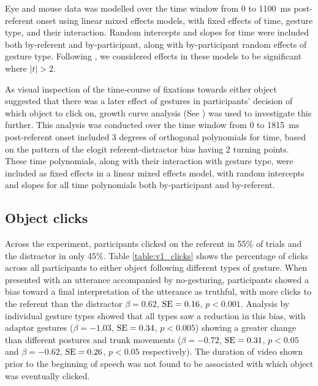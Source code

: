 \documentclass[a4paper,man,natbib]{apa6}
\newcommand{\resultsLog}[3]{$\beta = #1$, $\textnormal{SE} = #2$, $p #3$}
\begin{document}
Eye and mouse data was modelled over the time window from 0 to 1100~ms post-referent onset using linear mixed effects models, with fixed effects of time, gesture type, and their interaction.
Random intercepts and slopes for time were included both by-referent and by-participant, along with by-participant random effects of gesture type.
Following \citet{Baayen2008}, we considered effects in these models to be significant where $|t|>2$.

As visual inspection of the time-course of fixations towards either object suggested that there was a later effect of gestures in participants' decision of which object to click on, growth curve analysis (See \citealt{Mirman2008}) was used to investigate this further. 
This analysis was conducted over the time window from 0 to 1815~ms post-referent onset included 3 degrees of orthogonal polynomials for time, based on the pattern of the elogit referent-distractor bias having 2 turning points. 
These time polynomials, along with their interaction with gesture type, were included as fixed effects in a linear mixed effects model, with random intercepts and slopes for all time polynomials both by-participant and by-referent.


\subsection{Object clicks} %
Across the experiment, participants clicked on the referent in 55\% of trials and the distractor in only 45\%.
Table \ref{table:v1_clicks} shows the percentage of clicks across all participants to either object following different types of gesture.
When presented with an utterance accompanied by no-gesturing, participants showed a bias toward a final interpretation of the utterance as truthful, with more clicks to the referent than the distractor \resultsLog{0.62}{0.16}{<0.001}.
Analysis by individual gesture types showed that all types saw a reduction in this bias, with adaptor gestures (\resultsLog{-1.03}{0.34}{<0.005}) showing a greater change than different postures and trunk movements (\resultsLog{-0.72}{0.31}{<0.05} and \resultsLog{-0.62}{0.26}{<0.05} respectively). %
The duration of video shown prior to the beginning of speech was not found to be associated with which object was eventually clicked.
\end{document}
